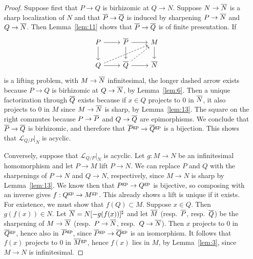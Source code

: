 \documentclass[10pt]{article}
\numberwithin{equation}{section}
\theoremstyle{definition}
\theoremstyle{remark}
\newcommand{\gp}[1]{#1^{\rm gp}}
\renewcommand{\bar}[1]{\overnorm{#1}\vphantom{#1}}
\def\overnorm#1{\overline{#1}\vphantom{#1}}
\begin{document}
\begin{proof}
	Suppose first that $P \to Q$ is birhizomic at $Q \to N$.  Suppose $N \to \bar N$ is a sharp localization of $N$ and that $\bar P \to \bar Q$ is induced by sharpening $P \to \bar N$ and $Q \to \bar N$.  Then Lemma~\ref{lem:11} shows that $\bar P \to \bar Q$ is of finite presentation.  If
	\begin{equation*} \begin{tikzcd}
		P \ar[r] \ar[d] & \bar P \ar[r] \ar[d] & M \ar[d] \\
		Q \ar[r] \ar[urr,dashed] &  \bar Q \ar[ur,dashed] \ar[r] & \bar N
	\end{tikzcd}
	\end{equation*}
	is a lifting problem, with $M \to \bar N$ infinitesimal, the longer dashed arrow exists because $P \to Q$ is birhizomic at $Q \to \bar N$, by Lemma~\ref{lem:6}.  Then a unique factorization through $\bar Q$ exists because if $x \in Q$ projects to $0$ in $\bar N$, it also projects to $0$ in $M$ since $M \to \bar N$ is sharp, by Lemma~\ref{lem:13}.  The square on the right commutes because $P \to \bar P$ and $Q \to \bar Q$ are epimorphisms.  We conclude that $\bar P \to \bar Q$ is birhizomic, and therefore that $\bar P^{\rm gp} \to \bar Q^{\rm gp}$ is a bijection.  This shows that $\mathcal L_{Q/P} \big|_N$ is acyclic.











	Conversely, suppose that $\mathcal L_{Q/P} \big|_N$ is acyclic.  Let $g : M \to N$ be an infinitesimal homomorphism and let $P \to M$ lift $P \to N$.  We can replace $P$ and $Q$ with the sharpenings of $P \to N$ and $Q \to N$, respectively, since $M \to N$ is sharp by Lemma~\ref{lem:13}.  We know then that $\gp P \to \gp Q$ is bijective, so composing with an inverse gives $f : \gp Q \to \gp M$.  This already shows a lift is unique if it exists.  For existence, we must show that $f(Q) \subset M$.  Suppose $x \in Q$.  Then $g(f(x)) \in N$.  Let $\bar N = N[-g(f(x))]^\sharp$ and let $\bar M$ (resp.\ $\bar P$, resp.\ $\bar Q$) be the sharpening of $M \to \bar N$ (resp.\ $P \to \bar N$, resp.\ $Q \to \bar N$).  Then $x$ projects to $0$ in $ \bar Q^{\rm gp}$, hence also in $\bar P^{\rm gp}$, since $\bar P^{\rm gp} \to \bar Q^{\rm gp}$ is an isomorphism.  It follows that $f(x)$ projects to $0$ in $\gp{\bar M}$, hence $f(x)$ lies in $M$, by Lemma~\ref{lem:3}, since $M \to N$ is infinitesimal.
\end{proof}
\end{document}

